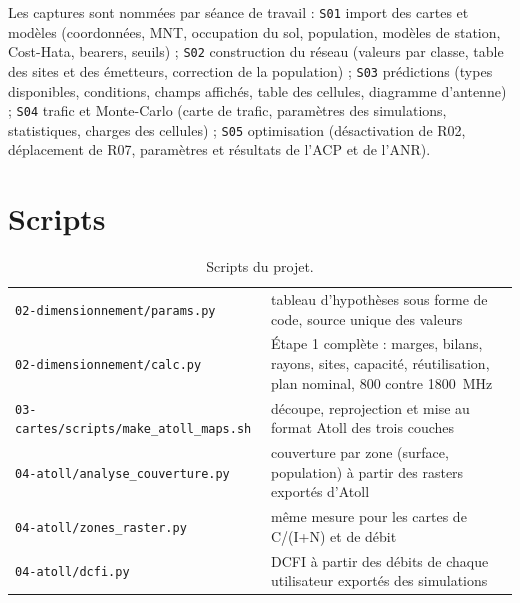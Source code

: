 Les captures sont nommées par séance de travail : \texttt{S01} import des cartes et modèles (coordonnées, MNT, occupation du sol, population, modèles de station, Cost-Hata, bearers, seuils) ; \texttt{S02} construction du réseau (valeurs par classe, table des sites et des émetteurs, correction de la population) ; \texttt{S03} prédictions (types disponibles, conditions, champs affichés, table des cellules, diagramme d'antenne) ; \texttt{S04} trafic et Monte-Carlo (carte de trafic, paramètres des simulations, statistiques, charges des cellules) ; \texttt{S05} optimisation (désactivation de R02, déplacement de R07, paramètres et résultats de l'ACP et de l'ANR).

\section*{Scripts}

\begin{table}[H]
\centering
\caption{Scripts du projet.}
\label{tab-scripts}
\small
\begin{tabularx}{\textwidth}{@{}lL@{}}
\toprule
{} &  \\
\midrule
\texttt{02-dimensionnement/params.py} & tableau d'hypothèses sous forme de code, source unique des valeurs \\
\texttt{02-dimensionnement/calc.py} & Étape 1 complète : marges, bilans, rayons, sites, capacité, réutilisation, plan nominal, 800 contre \SI{1800}{\mega\hertz} \\
\texttt{03-cartes/scripts/make\_atoll\_maps.sh} & découpe, reprojection et mise au format Atoll des trois couches \\
\texttt{04-atoll/analyse\_couverture.py} & couverture par zone (surface, population) à partir des rasters exportés d'Atoll \\
\texttt{04-atoll/zones\_raster.py} & même mesure pour les cartes de C/(I+N) et de débit \\
\texttt{04-atoll/dcfi.py} & DCFI à partir des débits de chaque utilisateur exportés des simulations \\
\bottomrule
\end{tabularx}
\end{table}
